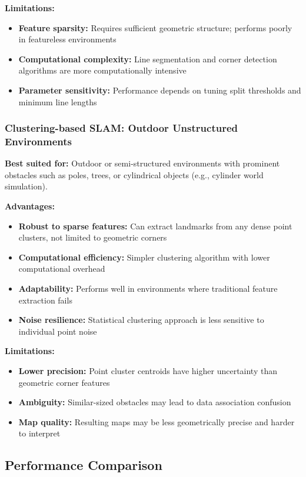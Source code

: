 \documentclass[12pt,a4paper]{article}
\begin{document}
\textbf{Limitations:}
\begin{itemize}
    \item \textbf{Feature sparsity:} Requires sufficient geometric structure; performs poorly in featureless environments
    \item \textbf{Computational complexity:} Line segmentation and corner detection algorithms are more computationally intensive
    \item \textbf{Parameter sensitivity:} Performance depends on tuning split thresholds and minimum line lengths
\end{itemize}

\subsubsection{Clustering-based SLAM: Outdoor Unstructured Environments}

\textbf{Best suited for:} Outdoor or semi-structured environments with prominent obstacles such as poles, trees, or cylindrical objects (e.g., cylinder world simulation).

\textbf{Advantages:}
\begin{itemize}
    \item \textbf{Robust to sparse features:} Can extract landmarks from any dense point clusters, not limited to geometric corners
    \item \textbf{Computational efficiency:} Simpler clustering algorithm with lower computational overhead
    \item \textbf{Adaptability:} Performs well in environments where traditional feature extraction fails
    \item \textbf{Noise resilience:} Statistical clustering approach is less sensitive to individual point noise
\end{itemize}

\textbf{Limitations:}
\begin{itemize}
    \item \textbf{Lower precision:} Point cluster centroids have higher uncertainty than geometric corner features
    \item \textbf{Ambiguity:} Similar-sized obstacles may lead to data association confusion
    \item \textbf{Map quality:} Resulting maps may be less geometrically precise and harder to interpret
\end{itemize}

\subsection{Performance Comparison}
\end{document}
